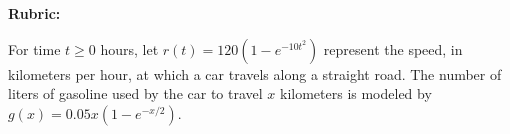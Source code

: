 \documentclass[12pt,addpoints,answers]{exam}
\begin{document}
\begin{questions}
\begin{solution}
\par\medskip
\textbf{Rubric:}\par
{}
\end{solution}

\question
For time $t \geq 0$ hours, let $r(t)=120\left(1-e^{-10 t^{2}}\right)$ represent the speed, in kilometers per hour, at which a car travels along a straight road. The number of liters of gasoline used by the car to travel $x$ kilometers is modeled by $g(x)=0.05 x\left(1-e^{-x / 2}\right)$.\\
\end{questions}
\end{document}
